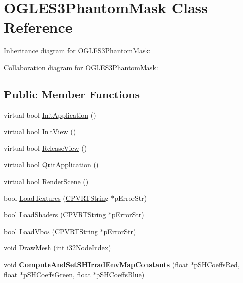 \hypertarget{class_o_g_l_e_s3_phantom_mask}{\section{O\+G\+L\+E\+S3\+Phantom\+Mask Class Reference}
\label{class_o_g_l_e_s3_phantom_mask}
}


Inheritance diagram for O\+G\+L\+E\+S3\+Phantom\+Mask\+:


Collaboration diagram for O\+G\+L\+E\+S3\+Phantom\+Mask\+:
\subsection*{Public Member Functions}
\begin{DoxyCompactItemize}
\item 
virtual bool \hyperlink{class_o_g_l_e_s3_phantom_mask_a5c565b65e0f47132e0b8ec136bd89213}{Init\+Application} ()
\item 
virtual bool \hyperlink{class_o_g_l_e_s3_phantom_mask_a95b0e9b5568bf9c7de8ed291471bf762}{Init\+View} ()
\item 
virtual bool \hyperlink{class_o_g_l_e_s3_phantom_mask_ae426b2f5e2f54fd3e4542f0713678074}{Release\+View} ()
\item 
virtual bool \hyperlink{class_o_g_l_e_s3_phantom_mask_a13bc395268b566c72039ed7989e4aea9}{Quit\+Application} ()
\item 
virtual bool \hyperlink{class_o_g_l_e_s3_phantom_mask_a6502d50a11f80c12da1eb4f75f7af361}{Render\+Scene} ()
\item 
bool \hyperlink{class_o_g_l_e_s3_phantom_mask_a2a60481d5f25069795417eb6e6d9b4ab}{Load\+Textures} (\hyperlink{class_c_p_v_r_t_string}{C\+P\+V\+R\+T\+String} $\ast$p\+Error\+Str)
\item 
bool \hyperlink{class_o_g_l_e_s3_phantom_mask_a1157519dd91aed2f4b8afdca39a109df}{Load\+Shaders} (\hyperlink{class_c_p_v_r_t_string}{C\+P\+V\+R\+T\+String} $\ast$p\+Error\+Str)
\item 
bool \hyperlink{class_o_g_l_e_s3_phantom_mask_a84dd9d9cbea2a366c7b8393e11293ce0}{Load\+Vbos} (\hyperlink{class_c_p_v_r_t_string}{C\+P\+V\+R\+T\+String} $\ast$p\+Error\+Str)
\item 
void \hyperlink{class_o_g_l_e_s3_phantom_mask_a88dd927de5f30e6877ca5a389bf68ebb}{Draw\+Mesh} (int i32\+Node\+Index)
\item 
\hypertarget{class_o_g_l_e_s3_phantom_mask_ab41347a6c9315b5363c67e198c6a4cbd}{void {\bfseries Compute\+And\+Set\+S\+H\+Irrad\+Env\+Map\+Constants} (float $\ast$p\+S\+H\+Coeffs\+Red, float $\ast$p\+S\+H\+Coeffs\+Green, float $\ast$p\+S\+H\+Coeffs\+Blue)}\label{class_o_g_l_e_s3_phantom_mask_ab41347a6c9315b5363c67e198c6a4cbd}

\end{DoxyCompactItemize}


